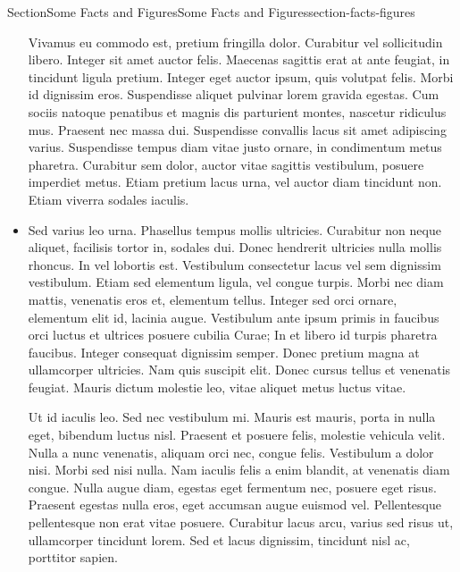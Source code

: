 \documentclass[twoside,10pt,]{article}
\numberwithin{equation}{section}
\begin{document}
\begin{sectionptx}{Section}{Some Facts and Figures}{}{Some Facts and Figures}{}{}{section-facts-figures}
\begin{multicols}{2}
\begin{itemize}[label=\textbullet]
\par
Vivamus eu commodo est, pretium fringilla dolor. Curabitur vel sollicitudin libero. Integer sit amet auctor felis. Maecenas sagittis erat at ante feugiat, in tincidunt ligula pretium. Integer eget auctor ipsum, quis volutpat felis. Morbi id dignissim eros. Suspendisse aliquet pulvinar lorem gravida egestas. Cum sociis natoque penatibus et magnis dis parturient montes, nascetur ridiculus mus. Praesent nec massa dui. Suspendisse convallis lacus sit amet adipiscing varius. Suspendisse tempus diam vitae justo ornare, in condimentum metus pharetra. Curabitur sem dolor, auctor vitae sagittis vestibulum, posuere imperdiet metus. Etiam pretium lacus urna, vel auctor diam tincidunt non. Etiam viverra sodales iaculis.%
\item{}Sed varius leo urna. Phasellus tempus mollis ultricies. Curabitur non neque aliquet, facilisis tortor in, sodales dui. Donec hendrerit ultricies nulla mollis rhoncus. In vel lobortis est. Vestibulum consectetur lacus vel sem dignissim vestibulum. Etiam sed elementum ligula, vel congue turpis. Morbi nec diam mattis, venenatis eros et, elementum tellus. Integer sed orci ornare, elementum elit id, lacinia augue. Vestibulum ante ipsum primis in faucibus orci luctus et ultrices posuere cubilia Curae; In et libero id turpis pharetra faucibus. Integer consequat dignissim semper. Donec pretium magna at ullamcorper ultricies. Nam quis suscipit elit. Donec cursus tellus et venenatis feugiat. Mauris dictum molestie leo, vitae aliquet metus luctus vitae.%
\par
Ut id iaculis leo. Sed nec vestibulum mi. Mauris est mauris, porta in nulla eget, bibendum luctus nisl. Praesent et posuere felis, molestie vehicula velit. Nulla a nunc venenatis, aliquam orci nec, congue felis. Vestibulum a dolor nisi. Morbi sed nisi nulla. Nam iaculis felis a enim blandit, at venenatis diam congue. Nulla augue diam, egestas eget fermentum nec, posuere eget risus. Praesent egestas nulla eros, eget accumsan augue euismod vel. Pellentesque pellentesque non erat vitae posuere. Curabitur lacus arcu, varius sed risus ut, ullamcorper tincidunt lorem. Sed et lacus dignissim, tincidunt nisl ac, porttitor sapien.%
\end{itemize}
\end{multicols}
%
\end{sectionptx}
%
%
\typeout{************************************************}
\typeout{************************************************}
%
\end{document}
